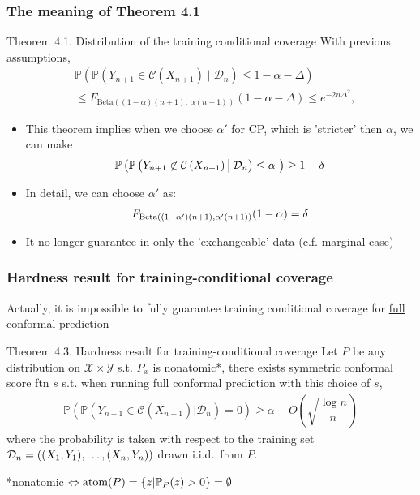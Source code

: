 \documentclass[compress]{beamer}
\begin{document}
\begin{frame}\frametitle{The meaning of Theorem 4.1}
	\begin{block}{Theorem 4.1. Distribution of the training conditional coverage}
		With previous assumptions,
		\begin{align*}
			&\mathbb{P}\left( 
			\mathbb{P}(Y_{n+1} \in \mathcal{C}(X_{n+1}) \mid \mathcal{D}_n) 
			\leq 1 - \alpha - \Delta 
			\right) 
			\\&\leq F_{\text{Beta}((1-\alpha)(n+1),\, \alpha(n+1))}(1 - \alpha - \Delta) 
			\leq e^{-2n\Delta^2},
		\end{align*}
	\end{block}
	\begin{itemize}
		\item This theorem implies when we choose $\alpha'$ for CP, which is 'stricter' then $\alpha$, we can make
		\begin{align*}
			\P\left(\P\left(Y_{n+1} \not\in \cC\left(X_{n+1}\right) \big| \: \cD_n\right)\le \alpha \ \right) \ge 1- \delta
		\end{align*}
		\item In detail, we can choose $\alpha'$ as:
		\begin{align*}
			F_{\textnormal{Beta}((1-\alpha')(n+1),\alpha'(n+1))}(1-\alpha)  = \delta
		\end{align*}
		\item It no longer guarantee in only the 'exchangeable' data (c.f. marginal case)
	\end{itemize}
\end{frame}



\begin{frame}\frametitle{Hardness result for training-conditional coverage}
	Actually, it is impossible to fully guarantee training
	conditional coverage for \underline{full conformal prediction}
	\begin{block}{Theorem 4.3. Hardness result for training-conditional coverage}
		Let $P$ be any distribution on $\mathcal{X\times Y}$ s.t. $P_x$ is nonatomic*, there exists symmetric conformal score ftn $s$ s.t. when running full conformal prediction with this choice
 of $s$,
		\begin{align*}
			\mathbb{P}\left(\mathbb{P}(Y_{n+1}\in \mathcal{C}(X_{n+1})|\mathcal{D}_n) = 0\right)\ge \alpha - O\left(\sqrt{\dfrac{\log n}{n}}\right)
		\end{align*}
		where the probability is taken with respect to the training set $\cD_n=((X_1,Y_1),\dots,(X_n,Y_n))$ drawn i.i.d.\ from $P$.
	\end{block}
	*nonatomic $\Leftrightarrow \text{atom}(P) = \{z|\P_{P}(z)>0\} = \emptyset$
\end{frame}
\end{document}
